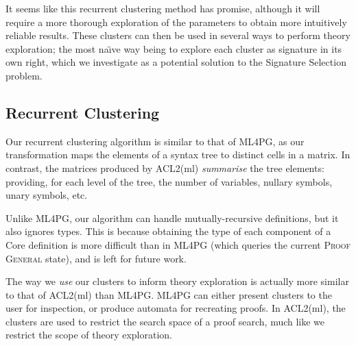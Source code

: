 It seems like this recurrent clustering method has promise\iffalse TODO: Alison: Informal, vague \fi, although it will
require a more thorough exploration of the parameters to obtain more intuitively
reliable results. These clusters can then be used in several ways to perform
theory exploration; the most na\"{\i}ve way being to explore each cluster as
\quickspec{} signature in its own right, which we investigate as a potential
solution to the Signature Selection problem.

\iffalse
TODO: Alison: Next chapter? It's good to lead into the next chapter at the end of the previous ones.
\fi

\iffalse
As alluded to previously, we also have the opportunity to reason by
\emph{analogy}. Similar to the work on ACL2(ml) \cite{heras2013proof}, we could
produce a general ``scheme'' from each equation we find (either through \quickspec{}
or by data mining test suites); like Isabelle approaches have shown
\cite{Montano-Rivas.McCasland.Dixon.ea:2012}, these schemes could then be
instantiated to a variety of similar values, in an attempt to find new theorems
which are analogues of existing results from a different context. ``Mutating''
existing theorem statements in such a way would also increase the chance of any
result being considered interesting; since it's likely that the unmodified
statement was deemed interesting, and the new result would not in general follow
as a simple logical consequence.
\fi

\iffalse
\subsection{Recurrent Clustering}
\label{sec:clusteringexpressions}

Our recurrent clustering algorithm is similar to that of ML4PG, as our
transformation maps the elements of a syntax tree to distinct cells in a
matrix. In contrast, the matrices produced by ACL2(ml) \emph{summarise} the tree
elements: providing, for each level of the tree, the number of variables,
nullary symbols, unary symbols, etc.

Unlike ML4PG, our algorithm can handle mutually-recursive definitions, but it
also ignores types. This is because obtaining the type of each component of a
Core definition is more difficult than in ML4PG (which queries the current
\textsc{Proof General} state), and is left for future work.

The way we \emph{use} our clusters to inform theory exploration is actually more
similar to that of ACL2(ml) than ML4PG. ML4PG can either present clusters to the
user for inspection, or produce automata for recreating proofs. In ACL2(ml), the
clusters are used to restrict the search space of a proof search, much like we
restrict the scope of theory exploration.

